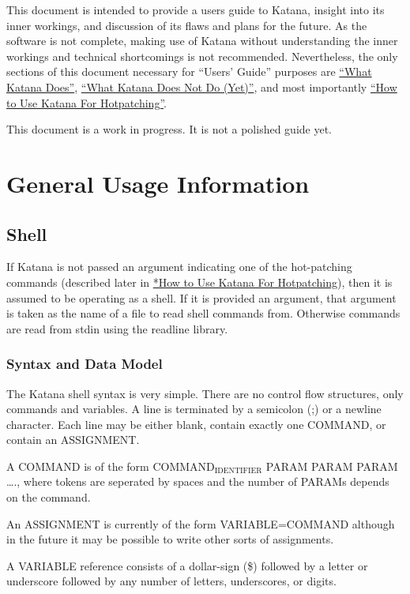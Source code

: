 \documentclass[11pt]{article}
\begin{document}
  This document is intended to provide a users guide to Katana,
  insight into its inner workings, and discussion of its flaws and
  plans for the future. As the software is not complete, making use of
  Katana without understanding the inner workings and technical
  shortcomings is not recommended. Nevertheless, the only sections of
  this document necessary for ``Users' Guide'' purposes are 
  \hyperref[sec-3.2]{``What Katana Does''}, \hyperref[sec-3.3]{``What Katana Does Not Do (Yet)''}, and most importantly 
  \hyperref[sec-3.5]{``How to Use Katana For Hotpatching''}.
 
  This document is a work in progress. It is not a polished guide yet.

\section{General Usage Information}
\label{sec-2}

\subsection{Shell}
\label{sec-2.1}

   If Katana is not passed an argument indicating one of the
   hot-patching commands (described later in  \hyperref[sec-3.5]{*How to Use Katana For Hotpatching}), then it is assumed to be operating as a shell. If it
   is provided an argument, that argument is taken as the name of a
   file to read shell commands from. Otherwise commands are read from
   stdin using the readline library. 
\subsubsection{Syntax and Data Model}
\label{sec-2.1.1}

    The Katana shell syntax is very simple. There are no control flow
    structures, only commands and variables. A line is terminated by a
    semicolon (;) or a newline character. Each line may be either
    blank, contain exactly one COMMAND, or contain an ASSIGNMENT.

    A COMMAND is of the form COMMAND$_{\mathrm{IDENTIFIER}}$ PARAM PARAM PARAM \ldots{}., where
    tokens are seperated by spaces and the number of PARAMs depends on
    the command.

    An ASSIGNMENT is currently of the form VARIABLE=COMMAND although
    in the future it may be possible to write other sorts of
    assignments.

    A VARIABLE reference consists of a dollar-sign (\$) followed by a
    letter or underscore followed by any number of letters,
    underscores, or digits.
\end{document}
